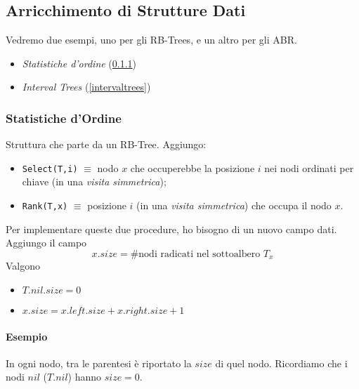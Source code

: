\subsection{Arricchimento di Strutture Dati}

Vedremo due esempi, uno per gli RB-Trees, e un altro per gli ABR.
\begin{itemize}[noitemsep]
    \item \emph{Statistiche d'ordine} (\ref{statistichedordine})
    \item \emph{Interval Trees} (\ref{intervaltrees})
\end{itemize}

\subsubsection{Statistiche d'Ordine} \label{statistichedordine}
Struttura che parte da un RB-Tree. Aggiungo:
\begin{itemize}
    \item \texttt{Select(T,i)} $\equiv$ nodo $x$ che occuperebbe la posizione $i$
        nei nodi ordinati per chiave (in una \emph{visita simmetrica});
    \item \texttt{Rank(T,x)} $\equiv$ posizione $i$ (in una \emph{visita simmetrica}) 
        che occupa il nodo $x$. 
\end{itemize}

Per implementare queste due procedure, ho bisogno di un nuovo campo dati. 
Aggiungo il campo 
$$x.size = \# \text{nodi radicati nel sottoalbero } T_x$$ 
Valgono
\begin{itemize}[label=,noitemsep]
    \item $T.nil.size = 0$
    \item $x.size = x.left.size + x.right.size + 1$
\end{itemize}

\paragraph{Esempio} In ogni nodo, tra le parentesi
è riportato la $size$ di quel nodo. Ricordiamo che i nodi $nil$ ($T.nil$)
hanno $size = 0$.

\begin{center}
\end{center}

